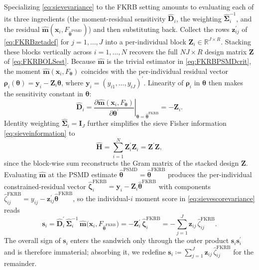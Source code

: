 Specializing \cref{eq:sievevariance} to the FKRB setting amounts to evaluating each of its three ingredients (the moment-residual sensitivity $\hat{\bm{D}}_i$, the weighting $\hat{\bm{\Sigma}}_i^{-1}$, and the residual $\hat{\bm{m}}(\bm{x}_i, F_{\hat{\bm{\theta}}^{\mathrm{PSMD}}})$) and then substituting back.
Collect the rows $\bm{z}_{ij}^\prime$ of \cref{eq:FKRBzetadef} for $j=1,\ldots,J$ into a per-individual block $\bm{Z}_i \in \mathbb{R}^{J\times R}$.
Stacking these blocks vertically across $i=1,\ldots,N$ recovers the full $NJ\times R$ design matrix $\bm{Z}$ of \cref{eq:FKRBOLSest}.
Because $\hat{\bm{m}}$ is the trivial estimator in \cref{eq:FKRBPSMDcrit}, the moment $\hat{\bm{m}}(\bm{x}_i, F_{\bm{\theta}})$ coincides with the per-individual residual vector $\bm{\rho}_i(\bm{\theta}) = \bm{y}_i - \bm{Z}_i\bm{\theta}$, where $\bm{y}_i = (y_{i1},\ldots,y_{iJ})^\prime$.
Linearity of $\bm{\rho}_i$ in $\bm{\theta}$ then makes the sensitivity constant in $\bm{\theta}$:
\begin{equation}
\label{eq:Dihatfkrb}
    \hat{\bm{D}}_i = \left.\frac{\partial \hat{\bm{m}}(\bm{x}_i,F_{\bm{\theta}})}{\partial \bm{\theta}^\prime}\right|_{\bm{\theta} = \hat{\bm{\theta}}^{\mathrm{FKRB}}} = -\bm{Z}_i.
\end{equation}
Identity weighting $\hat{\bm{\Sigma}}_i = \bm{I}_J$ further simplifies the sieve Fisher information \cref{eq:sieveinformation} to
\begin{equation}
\label{eq:Hhatfkrb}
    \hat{\bm{H}} = \sum_{i=1}^N \bm{Z}_i^\prime \bm{Z}_i = \bm{Z}^\prime\bm{Z},
\end{equation}
since the block-wise sum reconstructs the Gram matrix of the stacked design $\bm{Z}$.
Evaluating $\hat{\bm{m}}$ at the PSMD estimate $\hat{\bm{\theta}}^{\mathrm{PSMD}} = \hat{\bm{\theta}}^{\mathrm{FKRB}}$ produces the per-individual constrained-residual vector $\hat{\bm{\zeta}}_i^{\mathrm{FKRB}} = \bm{y}_i - \bm{Z}_i\hat{\bm{\theta}}^{\mathrm{FKRB}}$ with components $\hat{\zeta}_{ij}^{\mathrm{FKRB}} = y_{ij} - \bm{z}_{ij}^\prime \hat{\bm{\theta}}^{\mathrm{FKRB}}$, so the individual-$i$ moment score in \cref{eq:sievescorevariance} reads
\begin{equation}
\label{eq:sifkrb}
    \bm{s}_i = \hat{\bm{D}}_i^\prime\, \hat{\bm{\Sigma}}_i^{-1}\,\hat{\bm{m}}\bigl(\bm{x}_i,F_{\hat{\bm{\theta}}^{\mathrm{FKRB}}}\bigr) = -\bm{Z}_i^\prime\,\hat{\bm{\zeta}}_i^{\mathrm{FKRB}} = -\sum_{j=1}^J \bm{z}_{ij}\,\hat{\zeta}_{ij}^{\mathrm{FKRB}}.
\end{equation}
The overall sign of $\bm{s}_i$ enters the sandwich only through the outer product $\bm{s}_i\bm{s}_i^\prime$ and is therefore immaterial; absorbing it, we redefine $\bm{s}_i \coloneq \sum_{j=1}^J \bm{z}_{ij}\,\hat{\zeta}_{ij}^{\mathrm{FKRB}}$ for the remainder.
